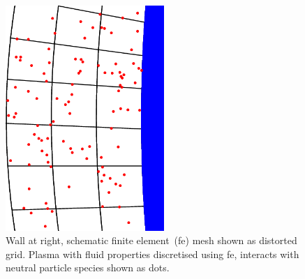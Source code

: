 \begin{figure}
\centerline{\includegraphics[width=6cm]{../png/pclonm}}
\caption{Wall at right, schematic finite element~(fe) mesh shown as distorted grid.
Plasma with fluid properties discretised using fe, interacts with neutral particle species
shown as dots.\label{fig:pcleover}}
\end{figure}
